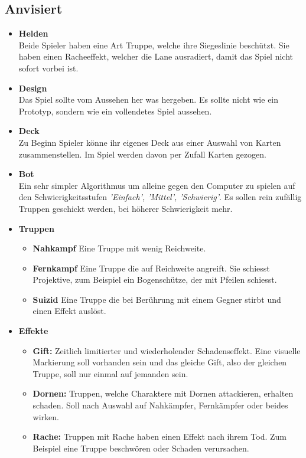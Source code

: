 \subsection{Anvisiert}
\begin{itemize}
    \item \textbf{Helden} \\
        Beide Spieler haben eine Art Truppe, welche ihre Siegeslinie beschützt. Sie haben einen Racheeffekt, welcher die
        Lane ausradiert, damit das Spiel nicht sofort vorbei ist.
    \item \textbf{Design} \\
        Das Spiel sollte vom Aussehen her was hergeben. Es sollte nicht wie ein Prototyp, sondern wie ein 
        vollendetes Spiel aussehen. 
    \item \textbf{Deck} \\
        Zu Beginn Spieler könne ihr eigenes Deck aus einer Auswahl von Karten zusammenstellen. Im Spiel werden davon per Zufall Karten gezogen.
    \item \textbf{Bot} \\
        Ein sehr simpler Algorithmus um alleine gegen den Computer zu spielen auf den Schwierigkeitsstufen \textit{'Einfach', 'Mittel', 'Schwierig'}.
        Es sollen rein zufällig Truppen geschickt werden, bei höherer Schwierigkeit mehr.
    \item \textbf{Truppen}
    \begin{itemize}
        \item \textbf{Nahkampf}
            Eine Truppe mit wenig Reichweite.
        \item \textbf{Fernkampf}
            Eine Truppe die auf Reichweite angreift. Sie schiesst Projektive, zum Beispiel ein Bogenschütze,
            der mit Pfeilen schiesst.
        \item \textbf{Suizid}
            Eine Truppe die bei Berührung mit einem Gegner stirbt und einen Effekt auslöst.
    \end{itemize}
    \item \textbf{Effekte}
    \begin{itemize}
        \item \textbf{Gift:}
            Zeitlich limitierter und wiederholender Schadenseffekt. Eine visuelle Markierung soll vorhanden sein
            und das gleiche Gift, also der gleichen Truppe, soll nur einmal auf jemanden sein.
        \item \textbf{Dornen:}
            Truppen, welche Charaktere mit Dornen attackieren, erhalten schaden. Soll nach Auswahl auf Nahkämpfer,
            Fernkämpfer oder beides wirken.
        \item \textbf{Rache:}
            Truppen mit Rache haben einen Effekt nach ihrem Tod. Zum Beispiel eine Truppe beschwören oder Schaden verursachen.
    \end{itemize}
\end{itemize}

